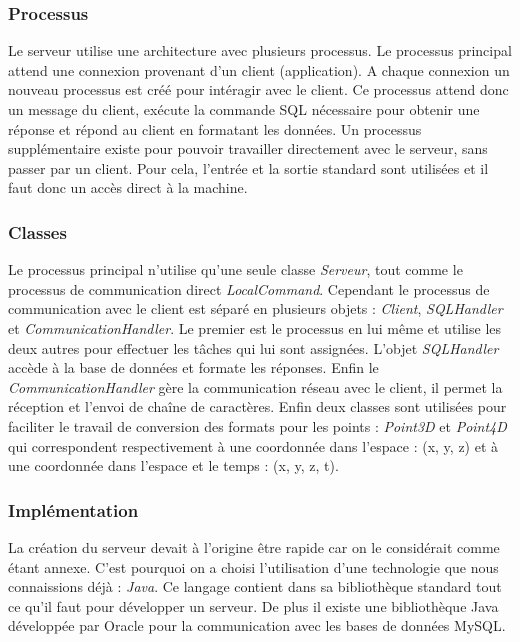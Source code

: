 \subsubsection{Processus}
Le serveur utilise une architecture avec plusieurs processus. Le processus principal attend une connexion provenant d'un client (application).
A chaque connexion un nouveau processus est créé pour intéragir avec le client. Ce processus attend donc un message du client, exécute la commande
SQL nécessaire pour obtenir une réponse et répond au client en formatant les données. Un processus supplémentaire existe pour pouvoir
travailler directement avec le serveur, sans passer par un client. Pour cela, l'entrée et la sortie standard sont utilisées et il faut donc un accès direct à la machine.
\subsubsection{Classes}
Le processus principal n'utilise qu'une seule classe \emph{Serveur}, tout comme le processus de communication direct \emph{LocalCommand}.
Cependant le processus de communication avec le client est séparé en plusieurs objets : \emph{Client}, \emph{SQLHandler} et \emph{CommunicationHandler}. 
Le premier est le processus en lui même et utilise les deux autres pour effectuer les tâches qui lui sont assignées. L'objet \emph{SQLHandler} accède à la base de données et formate les réponses.
Enfin le \emph{CommunicationHandler} gère la communication réseau avec le client, il permet la réception et l'envoi de chaîne de caractères.
Enfin deux classes sont utilisées pour faciliter le travail de conversion des formats pour les points : \emph{Point3D} et \emph{Point4D} qui correspondent respectivement à une coordonnée dans l'espace : (x, y, z)
et à une coordonnée dans l'espace et le temps : (x, y, z, t).

\subsubsection{Implémentation}
La création du serveur devait à l'origine être rapide car on le considérait comme étant annexe. C'est pourquoi on a choisi l'utilisation d'une
technologie que nous connaissions déjà : \emph{Java}. Ce langage contient dans sa bibliothèque standard tout ce qu'il faut pour développer un serveur.
De plus il existe une bibliothèque Java développée par Oracle pour la communication avec les bases de données MySQL.


